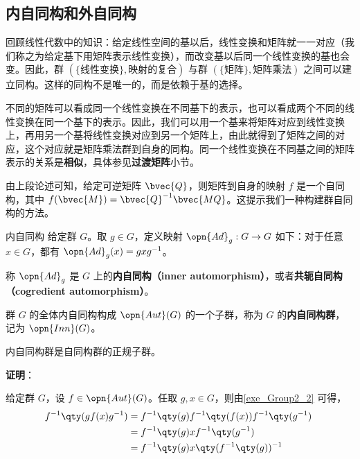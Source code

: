 \subsection{内自同构和外自同构}



回顾线性代数中的知识：给定线性空间的基以后，线性变换和矩阵就一一对应（我们称之为给定基下用矩阵表示线性变换），而改变基以后同一个线性变换的基也会变。因此，群 $(\{\text{线性变换}\}, \text{映射的复合})$ 与群 $(\{\text{矩阵}\}, \text{矩阵乘法})$ 之间可以建立同构。这样的同构不是唯一的，而是依赖于基的选择。

不同的矩阵可以看成同一个线性变换在不同基下的表示，也可以看成两个不同的线性变换在同一个基下的表示。因此，我们可以用一个基来将矩阵对应到线性变换上，再用另一个基将线性变换对应到另一个矩阵上，由此就得到了矩阵之间的对应，这个对应就是矩阵乘法群到自身的同构。同一个线性变换在不同基之间的矩阵表示的关系是\textbf{相似}，具体参见\textbf{过渡矩阵}小节。

由上段论述可知，给定可逆矩阵 $\bvec{Q}$，则矩阵到自身的映射 $f$ 是一个自同构，其中 $f(\bvec{M})=\bvec{Q}^{-1}\bvec{MQ}$。这提示我们一种构建群自同构的方法。

\begin{definition}{内自同构}
给定群 $G$。取 $g\in G$，定义映射 $\opn{Ad}_g:G\to G$ 如下：对于任意 $x\in G$，都有 $\opn{Ad}_g(x)=gxg^{-1}$。

称 $\opn{Ad}_g$ 是 $G$ 上的\textbf{内自同构（inner automorphism）}，或者\textbf{共轭自同构（cogredient automorphism）}。


群 $G$ 的全体内自同构构成 $\opn{Aut}(G)$ 的一个子群，称为 $G$ 的\textbf{内自同构群}， 记为 $\opn{Inn}(G)$。

\end{definition}

\begin{theorem}{}\label{the_Group2_1}
内自同构群是自同构群的正规子群。
\end{theorem}

\textbf{证明}：

给定群 $G$，设 $f\in \opn{Aut}(G)$。任取 $g, x\in G$，则由\autoref{exe_Group2_2} 可得，
\begin{equation}\label{eq_Group2_1}
\begin{aligned}
f^{-1}\qty(gf(x)g^{-1})&=f^{-1}\qty(g)f^{-1}\qty(f(x))f^{-1}\qty(g^{-1})\\
&=f^{-1}\qty(g)xf^{-1}\qty(g^{-1})\\
&=f^{-1}\qty(g)x\qty(f^{-1}\qty(g))^{-1}
\end{aligned}~
\end{equation}

